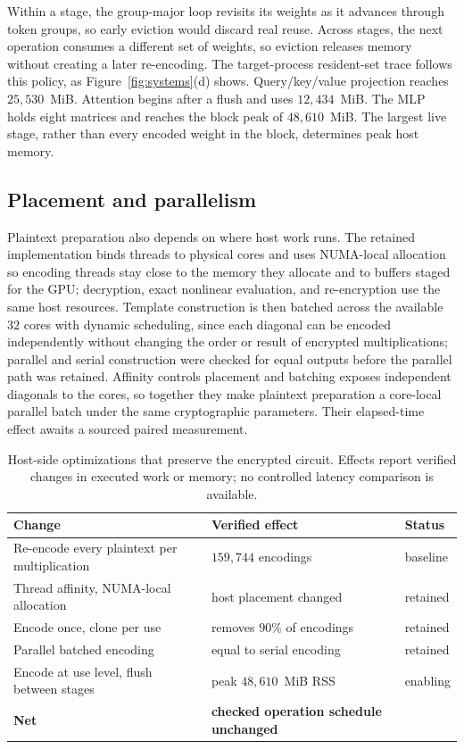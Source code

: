 Within a stage, the group-major loop revisits its weights as it advances through token groups, so
early eviction would discard real reuse. Across stages, the next operation consumes a different set
of weights, so eviction releases memory without creating a later re-encoding. The target-process
resident-set trace follows this policy, as
Figure~\ref{fig:systems}(d) shows. Query/key/value projection reaches
$25{,}530$~MiB. Attention begins after a flush and uses $12{,}434$~MiB. The MLP holds eight
matrices and reaches the block peak of $48{,}610$~MiB. The largest live stage, rather than every
encoded weight in the block, determines peak host memory.

\subsection{Placement and parallelism}
Plaintext preparation also depends on where host work runs. The retained implementation binds
threads to physical cores and uses NUMA-local allocation so encoding threads stay close to the
memory they allocate and to buffers staged for the GPU; decryption, exact nonlinear evaluation, and
re-encryption use the same host resources. Template construction is then batched across the
available $32$ cores with dynamic scheduling, since each diagonal can be encoded independently
without changing the order or result of encrypted multiplications; parallel and serial construction
were checked for equal outputs before the parallel path was retained. Affinity controls placement
and batching exposes independent diagonals to the cores, so together they make plaintext preparation
a core-local parallel batch under the same cryptographic parameters. Their elapsed-time effect
awaits a sourced paired measurement.

\begin{table}[!tb]\centering\small
\caption{Host-side optimizations that preserve the encrypted circuit. Effects report verified
changes in executed work or memory; no controlled latency comparison is available.}
\label{tab:optimization}
\begin{tabularx}{\linewidth}{Y l l}
\toprule
Change & Verified effect & Status \\
\midrule
Re-encode every plaintext per multiplication & $159{,}744$ encodings & baseline \\
Thread affinity, NUMA-local allocation & host placement changed & retained \\
Encode once, clone per use & removes $90\%$ of encodings & retained \\
Parallel batched encoding & equal to serial encoding & retained \\
Encode at use level, flush between stages & peak $48{,}610$~MiB RSS & enabling \\
\midrule
\textbf{Net} & \textbf{checked operation schedule unchanged} & \\
\bottomrule
\end{tabularx}
\end{table}

